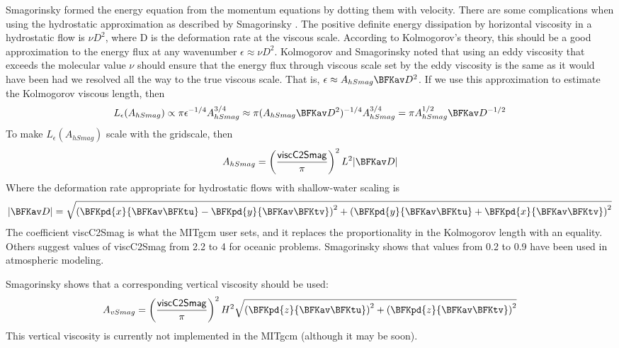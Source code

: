 Smagorinsky formed the energy equation from the momentum equations by
dotting them with velocity.  There are some complications when using
the hydrostatic approximation as described by Smagorinsky
\cite{Smagorinsky93}.  The positive definite energy dissipation by
horizontal viscosity in a hydrostatic flow is $\nu D^2$, where D is
the deformation rate at the viscous scale.  According to Kolmogorov's
theory, this should be a good approximation to the energy flux at any
wavenumber $\epsilon\approx\nu D^2$.  Kolmogorov and Smagorinsky noted
that using an eddy viscosity that exceeds the molecular value $\nu$
should ensure that the energy flux through viscous scale set by the
eddy viscosity is the same as it would have been had we resolved all
the way to the true viscous scale.  That is, $\epsilon\approx
A_{hSmag} \BFKav D^2$.  If we use this approximation to estimate the
Kolmogorov viscous length, then
\begin{equation}
L_\epsilon(A_{hSmag})\propto\pi\epsilon^{-1/4}A_{hSmag}^{3/4}\approx\pi(A_{hSmag}
\BFKav D^2)^{-1/4}A_{hSmag}^{3/4} = \pi A_{hSmag}^{1/2}\BFKav D^{-1/2}
\end{equation}
To make $L_\epsilon(A_{hSmag})$ scale with the gridscale, then
\begin{equation}
A_{hSmag} = \left(\frac{{\sf viscC2Smag}}{\pi}\right)^2L^2|\BFKav D|
\end{equation}
Where the deformation rate appropriate for hydrostatic flows with
shallow-water scaling is
\begin{equation}
|\BFKav D|=\sqrt{\left(\BFKpd{x}{\BFKav \BFKtu}-\BFKpd{y}{\BFKav \BFKtv}\right)^2
+\left(\BFKpd{y}{\BFKav \BFKtu}+\BFKpd{x}{\BFKav \BFKtv}\right)^2}
\end{equation}
The coefficient {\sf viscC2Smag} is what the MITgcm user sets, and it
replaces the proportionality in the Kolmogorov length with an
equality.  Others \cite{grha00} suggest values of {\sf viscC2Smag}
from 2.2 to 4 for oceanic problems.  Smagorinsky \cite{Smagorinsky93}
shows that values from 0.2 to 0.9 have been used in atmospheric
modeling.

Smagorinsky \cite{Smagorinsky93} shows that a corresponding vertical
viscosity should be used:
\begin{equation}
A_{vSmag}=\left(\frac{{\sf viscC2Smag}}{\pi}\right)^2H^2
\sqrt{\left(\BFKpd{z}{\BFKav \BFKtu}\right)^2
+\left(\BFKpd{z}{\BFKav \BFKtv}\right)^2}
\end{equation}
This vertical viscosity is currently not implemented in the MITgcm
(although it may be soon).

